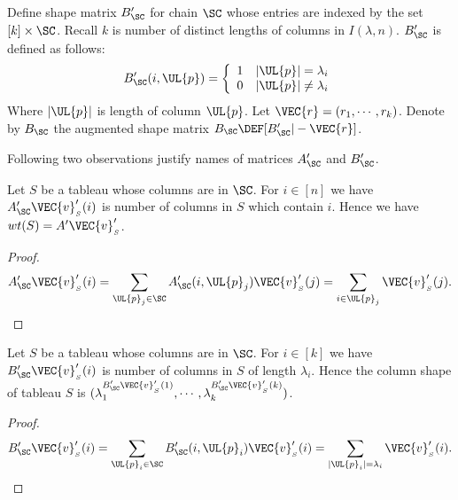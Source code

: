     Define shape matrix \(B'_{\SC}\) for chain \(\SC\) whose entries are indexed by the set
    \([k] \times \SC\).
    Recall \(k\) is number of distinct lengths of columns in \(I(\lambda,n)\). 
    \(B'_{\SC}\) is defined  as follows:
    \[
        B'_{\SC}(i,\UL{p})=
        \left\{\begin{array}{cc}
            1  &  |\UL{p}| = \lambda_i\\
            0  &  |\UL{p}| \ne \lambda_i
        \end{array}\right.
    \]
    Where \(|\UL{p}|\) is length of column \(\UL{p}\). Let \(\VEC{r} = (r_1,\cdots,r_k)\). 
    Denote by \(B_{\SC}\) the augmented shape matrix \(B_{\SC} \DEF [B'_{\SC} | -\VEC{r}]\). 

    Following two observations justify names of matrices \(A'_{\SC}\) and \(B'_{\SC}\).
    \begin{observation}
        Let \(S\) be a tableau whose columns are in \(\SC\). For \(i \in [n]\) we have
        \(A'_{\SC}\VEC{v}'_{_S}(i)\) is number of columns in \(S\) which contain \(i\).
        Hence we have \(wt(S) = A'\VEC{v}'_{_S}\).
    \end{observation}
    \begin{proof}
        \[
            A'_{\SC}\VEC{v}'_{_S}(i) 
            = \sum_{\UL{p}_j \in \SC} A'_{\SC}(i,\UL{p}_j) \VEC{v}'_{_S}(j)
            = \sum_{i \in \UL{p}_j} \VEC{v}'_{_S}(j).
        \]
    \end{proof}
    \begin{observation}
        Let \(S\) be a tableau whose columns are in \(\SC\). For \(i \in [k]\) we have
        \(B'_{\SC}\VEC{v}'_{_S}(i)\) is number of columns in \(S\) of length \(\lambda_i\).
        Hence the column shape of tableau \(S\) is 
        \((\lambda_1^{B'_{\SC} \VEC{v}'_{_S}(1)}, \cdots,\lambda_k^{B'_{\SC}\VEC{v}'_{_S}(k)})\). 
    \end{observation}
    \begin{proof}
        \[
            B'_{\SC}\VEC{v}'_{_S}(i) 
            = \sum_{\UL{p}_i \in \SC} B'_{\SC}(i,\UL{p}_i) \VEC{v}'_{_S}(i)
            = \sum_{|\UL{p}_i| =\lambda_i} \VEC{v}'_{_S}(i).
        \]
    \end{proof}

